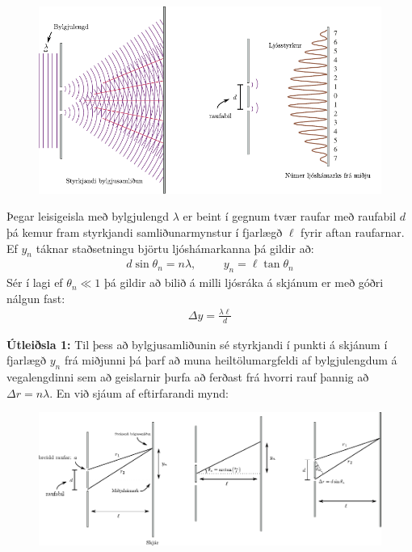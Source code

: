 \ifdefined \wholebook \else\documentclass[oneside]{book}\usepackage{EdlBook}\graphicspath{{figures/}}
\begin{document}
\begin{figure}[H]
    \centering
    \includegraphics[scale = 0.9]{figures/young-double.pdf}
\end{figure}


\begin{tcolorbox}
\begin{theorem}
Þegar leisigeisla með bylgjulengd $\lambda$ er beint í gegnum tvær raufar með raufabil $d$ þá kemur fram styrkjandi samliðunarmynstur í fjarlægð $\ell$ fyrir aftan raufarnar. Ef $y_n$ táknar staðsetningu björtu ljóshámarkanna þá gildir að:
\begin{align*}
    d\sin\theta_n = n\lambda, \hspace{1cm} y_n = \ell \tan\theta_n
\end{align*}
Sér í lagi ef $\theta_n \ll 1$ þá gildir að bilið á milli ljósráka á skjánum er með góðri nálgun fast:
\begin{align*}
    \Delta y = \frac{\lambda \ell}{d}
\end{align*}
\end{theorem}
\end{tcolorbox}

\textbf{Útleiðsla 1:} Til þess að bylgjusamliðunin sé styrkjandi í punkti á skjánum í fjarlægð $y_n$ frá miðjunni þá þarf að muna heiltölumargfeldi af bylgjulengdum á vegalengdinni sem að geislarnir þurfa að ferðast frá hvorri rauf þannig að $\Delta r = n\lambda$. En við sjáum af eftirfarandi mynd:

\begin{figure}[H]
    \centering
    \includegraphics{figures/young-diagram.pdf}
\end{figure}
\end{document}
